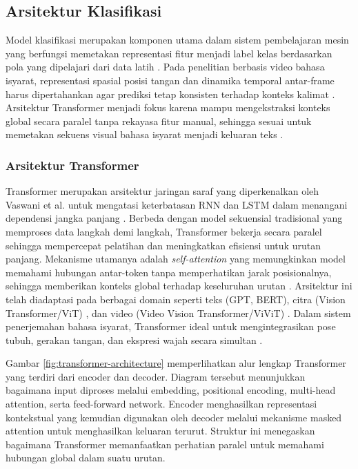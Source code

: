 \subsection{Arsitektur Klasifikasi} \label{II.teori4}
Model klasifikasi merupakan komponen utama dalam sistem pembelajaran mesin yang berfungsi memetakan representasi fitur menjadi label kelas berdasarkan pola yang dipelajari dari data latih \cite{IGoodfellow2016}. Pada penelitian berbasis video bahasa isyarat, representasi spasial posisi tangan dan dinamika temporal antar-frame harus dipertahankan agar prediksi tetap konsisten terhadap konteks kalimat \cite{Vaswani2023}. Arsitektur Transformer menjadi fokus karena mampu mengekstraksi konteks global secara paralel tanpa rekayasa fitur manual, sehingga sesuai untuk memetakan sekuens visual bahasa isyarat menjadi keluaran teks \cite{Aljabar2020}.\par

\subsubsection{Arsitektur Transformer} \label{II.Teori4.4}
Transformer merupakan arsitektur jaringan saraf yang diperkenalkan oleh Vaswani et al. untuk mengatasi keterbatasan RNN dan LSTM dalam menangani dependensi jangka panjang \cite{Vaswani2023}. Berbeda dengan model sekuensial tradisional yang memproses data langkah demi langkah, Transformer bekerja secara paralel sehingga mempercepat pelatihan dan meningkatkan efisiensi untuk urutan panjang. Mekanisme utamanya adalah \textit{self-attention} yang memungkinkan model memahami hubungan antar-token tanpa memperhatikan jarak posisionalnya, sehingga memberikan konteks global terhadap keseluruhan urutan \cite{Vaswani2023}. Arsitektur ini telah diadaptasi pada berbagai domain seperti teks (GPT, BERT), citra (Vision Transformer/ViT) \cite{Dosovitskiy2021}, dan video (Video Vision Transformer/ViViT) \cite{Arnab2021}. Dalam sistem penerjemahan bahasa isyarat, Transformer ideal untuk mengintegrasikan pose tubuh, gerakan tangan, dan ekspresi wajah secara simultan \cite{Saputra2024}.

Gambar \ref{fig:transformer-architecture} memperlihatkan alur lengkap Transformer yang terdiri dari encoder dan decoder. Diagram tersebut menunjukkan bagaimana input diproses melalui embedding, positional encoding, multi-head attention, serta feed-forward network. Encoder menghasilkan representasi kontekstual yang kemudian digunakan oleh decoder melalui mekanisme masked attention untuk menghasilkan keluaran terurut. Struktur ini menegaskan bagaimana Transformer memanfaatkan perhatian paralel untuk memahami hubungan global dalam suatu urutan.

